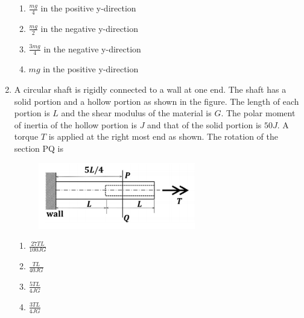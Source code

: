 \documentclass[a4paper,10pt]{article}
\begin{document}
\begin{enumerate}
\hfill{}
\begin{enumerate}
    \item $\frac{mg}{4}$ in the positive y-direction
    \item $\frac{mg}{2}$ in the negative y-direction
    \item $\frac{3mg}{4}$ in the negative y-direction
    \item $mg$ in the positive y-direction
\end{enumerate}

\item A circular shaft is rigidly connected to a wall at one end. The shaft has a solid portion and a hollow portion as shown in the figure. The length of each portion is $L$ and the shear modulus of the material is $G$. The polar moment of inertia of the hollow portion is $J$ and that of the solid portion is $50J$. A torque $T$ is applied at the right most end as shown. The rotation of the section PQ is
\begin{figure}[H]
    \centering
    \includegraphics[width=0.5\columnwidth]{q78.png}
    \caption*{}
    \label{fig:q78}
\end{figure}

\hfill{}
\begin{enumerate}
    \item $\frac{27TL}{100JG}$
    \item $\frac{TL}{40JG}$
    \item $\frac{5TL}{4JG}$
    \item $\frac{3TL}{4JG}$
\end{enumerate}


\end{enumerate}
\end{document}
